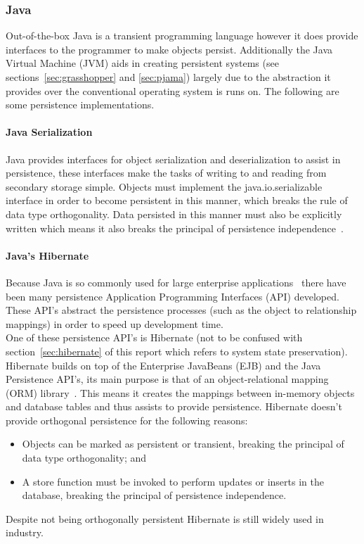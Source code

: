 \documentclass[a4paper,12pt]{article}
\begin{document}
\subsubsection{Java}
Out-of-the-box Java is a transient programming language however it does provide interfaces to the programmer to make objects persist. Additionally the Java Virtual Machine (JVM) aids in creating persistent systems (see sections~\ref{sec:grasshopper} and \ref{sec:pjama}) largely due to the abstraction it provides over the conventional operating system is runs on. The following are some persistence implementations.
\paragraph{Java Serialization}
Java provides interfaces for object serialization and deserialization to assist in persistence, these interfaces make the tasks of writing to and reading from secondary storage simple. Objects must implement the java.io.serializable interface in order to become persistent in this manner, which breaks the rule of data type orthogonality. Data persisted in this manner must also be explicitly written which means it also breaks the principal of persistence independence~\citep{ADearle}.
\par
\paragraph{Java's Hibernate}\label{sec:javahibernate}
Because Java is so commonly used for large enterprise applications~\citep{persistenceandjava} there have been many persistence Application Programming Interfaces (API) developed. These API's abstract the persistence processes (such as the object to relationship mappings) in order to speed up development time. 
\\One of these persistence API's is Hibernate (not to be confused with section~\ref{sec:hibernate} of this report which refers to system state preservation). Hibernate builds on top of the Enterprise JavaBeans (EJB) and the Java Persistence API's, its main purpose is that of an object-relational mapping (ORM) library~\citep{hibernateORM}. This means it creates the mappings between in-memory objects and database tables and thus assists to provide persistence. Hibernate doesn't provide orthogonal persistence for the following reasons:
\begin{itemize}
    \item{Objects can be marked as persistent or transient, breaking the principal of data type orthogonality; and}
    \item{A store function must be invoked to perform updates or inserts in the database, breaking the principal of persistence independence.}
\end{itemize}
Despite not being orthogonally persistent Hibernate is still widely used in industry.
\par
\end{document}
